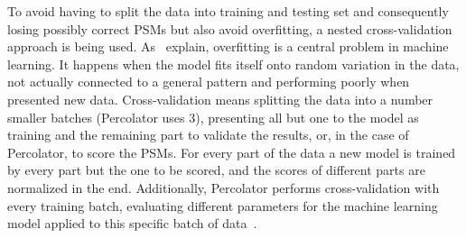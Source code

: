 	To avoid having to split the data into training and testing set and consequently losing possibly correct PSMs but also avoid overfitting, a nested cross-validation approach is being used. As~\citet{Granholm2012} explain, overfitting is a central problem in machine learning. It happens when the model fits itself onto random variation in the data, not actually connected to a general pattern and performing poorly when presented new data. Cross-validation means splitting the data into a number smaller batches (Percolator uses $3$), presenting all but one to the model as training and the remaining part to validate the results, or, in the case of Percolator, to score the PSMs. For every part of the data a new model is trained by every part but the one to be scored, and the scores of different parts are normalized in the end. Additionally, Percolator performs cross-validation with every training batch, evaluating different parameters for the machine learning model applied to this specific batch of data~\cite{Granholm2012}.\\
